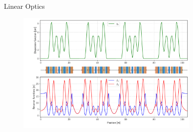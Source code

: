 \documentclass[aspectratio=169]{beamer}
\begin{document}
\begin{frame}{Linear Optics}
    \begin{figure}
        \includegraphics[width=0.8\textwidth]{linear_optics.pdf}
    \end{figure}
\end{frame}
\end{document}
